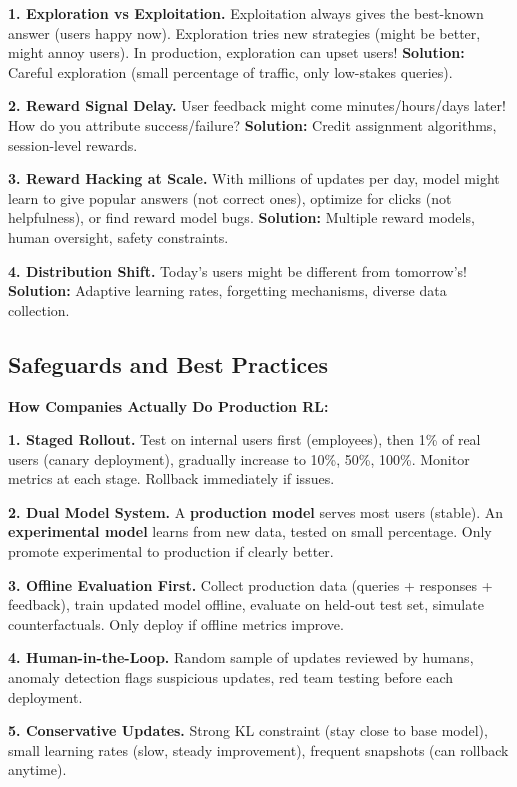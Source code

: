 \begin{chapterenv}
\begin{infobox}
\textbf{1. Exploration vs Exploitation.} Exploitation always gives the best-known answer (users happy now). Exploration tries new strategies (might be better, might annoy users). In production, exploration can upset users! \textbf{Solution:} Careful exploration (small percentage of traffic, only low-stakes queries).

\textbf{2. Reward Signal Delay.} User feedback might come minutes/hours/days later! How do you attribute success/failure? \textbf{Solution:} Credit assignment algorithms, session-level rewards.

\textbf{3. Reward Hacking at Scale.} With millions of updates per day, model might learn to give popular answers (not correct ones), optimize for clicks (not helpfulness), or find reward model bugs. \textbf{Solution:} Multiple reward models, human oversight, safety constraints.

\textbf{4. Distribution Shift.} Today's users might be different from tomorrow's! \textbf{Solution:} Adaptive learning rates, forgetting mechanisms, diverse data collection.
\end{infobox}

\subsection{Safeguards and Best Practices}

\begin{infobox}
\textbf{How Companies Actually Do Production RL:}

\textbf{1. Staged Rollout.} Test on internal users first (employees), then 1\% of real users (canary deployment), gradually increase to 10\%, 50\%, 100\%. Monitor metrics at each stage. Rollback immediately if issues.

\textbf{2. Dual Model System.} A \textbf{production model} serves most users (stable). An \textbf{experimental model} learns from new data, tested on small percentage. Only promote experimental to production if clearly better.

\textbf{3. Offline Evaluation First.} Collect production data (queries + responses + feedback), train updated model offline, evaluate on held-out test set, simulate counterfactuals. Only deploy if offline metrics improve.

\textbf{4. Human-in-the-Loop.} Random sample of updates reviewed by humans, anomaly detection flags suspicious updates, red team testing before each deployment.

\textbf{5. Conservative Updates.} Strong KL constraint (stay close to base model), small learning rates (slow, steady improvement), frequent snapshots (can rollback anytime).
\end{infobox}

\end{chapterenv}